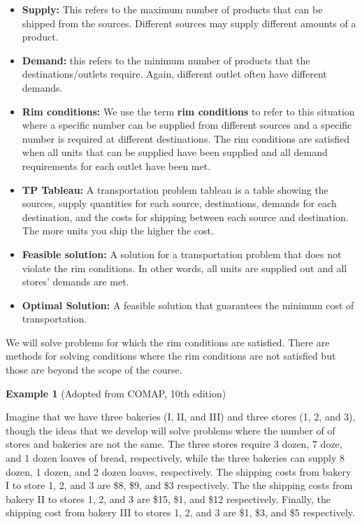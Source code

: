 \documentclass[
  letterpaper,
  DIV=11,
  numbers=noendperiod]{scrreprt}
\begin{document}
\begin{itemize}
\item
  \textbf{Supply:} This refers to the maximum number of products that
  can be shipped from the sources. Different sources may supply
  different amounts of a product.
\item
  \textbf{Demand:} this refers to the minimum number of products that
  the destinations/outlets require. Again, different outlet often have
  different demands.
\item
  \textbf{Rim conditions:} We use the term \textbf{rim conditions} to
  refer to this situation where a specific number can be supplied from
  different sources and a specific number is required at different
  destinations. The rim conditions are satisfied when all units that can
  be supplied have been supplied and all demand requirements for each
  outlet have been met.
\item
  \textbf{TP Tableau:} A transportation problem tableau is a table
  showing the sources, supply quantities for each source, destinations,
  demands for each destination, and the costs for shipping between each
  source and destination. The more units you ship the higher the cost.
\item
  \textbf{Feasible solution:} A solution for a transportation problem
  that does not violate the rim conditions. In other words, all units
  are supplied out and all stores' demands are met.
\item
  \textbf{Optimal Solution:} A feasible solution that guarantees the
  minimum cost of transportation.
\end{itemize}

We will solve problems for which the rim conditions are satisfied. There
are methods for solving conditions where the rim conditions are not
satisfied but those are beyond the scope of the course.

\textbf{Example 1} (Adopted from COMAP, 10th edition)

Imagine that we have three bakeries (I, II, and III) and three stores
(1, 2, and 3), though the ideas that we develop will solve problems
where the number of of stores and bakeries are not the same. The three
stores require 3 dozen, 7 doze, and 1 dozen loaves of bread,
respectively, while the three bakeries can supply 8 dozen, 1 dozen, and
2 dozen loaves, respectively. The shipping costs from bakery I to store
1, 2, and 3 are \$8, \$9, and \$3 respectively. The the shipping costs
from bakery II to stores 1, 2, and 3 are \$15, \$1, and \$12
respectively. Finally, the shipping cost from bakery III to stores 1, 2,
and 3 are \$1, \$3, and \$5 respectively.
\end{document}

